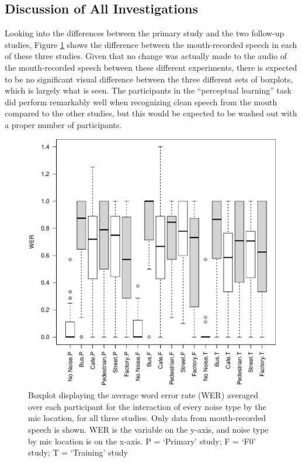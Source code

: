 \documentclass[dissertation,copyright]{uathesis}
\makeatletter
\def\maxwidth{ %
  \ifdim\Gin@nat@width>\linewidth
    \linewidth
  \else
    \Gin@nat@width
  \fi
}
\makeatother
\begin{document}
\subsection{Discussion of All Investigations}
\label{ch4:glob_discussion}

Looking into the differences between the primary study and the two follow-up studies, Figure \ref{fig:ALLXperc_noiseXmic_mouth_boxplot} shows the difference between the mouth-recorded speech in each of these three studies.  Given that no change was actually made to the audio of the mouth-recorded speech between these different experiments, there is expected to be no significant visual difference between the three different sets of boxplots, which is largely what is seen.  The participants in the ``perceptual learning'' task did perform remarkably well when recognizing clean speech from the mouth compared to the other studies, but this would be expected to be washed out with a proper number of participants.

\begin{figure}[h!]

\includegraphics[width=\maxwidth]{figure/boxplot_noiseXmicXall_mouth-1} 

\caption{Boxplot displaying the average word error rate (WER) averaged over each participant for the interaction of every noise type by the mic location, for all three studies. Only data from mouth-recorded speech is shown. WER is the variable on the y-axis, and noise type by mic location is on the x-axis. P = `Primary' study; F = `F0' study; T = `Training' study}
\label{fig:ALLXperc_noiseXmic_mouth_boxplot}
\end{figure}
\end{document}
